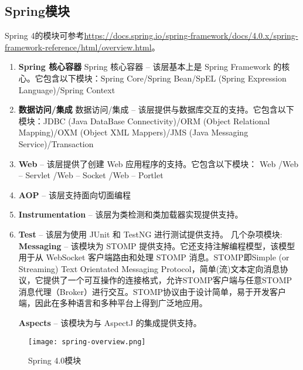 \documentclass[../../../interview-questions.tex]{subfiles}
\begin{document}
\subsection{Spring模块}

Spring 4的模块可参考\url{https://docs.spring.io/spring-framework/docs/4.0.x/spring-framework-reference/html/overview.html}。

\begin{enumerate}
    \item {\textbf{Spring 核心容器}}
Spring 核心容器 – 该层基本上是 Spring Framework 的核心。它包含以下模块：Spring Core/Spring Bean/SpEL (Spring Expression Language)/Spring Context
    \item{\textbf{数据访问/集成}}
数据访问/集成 – 该层提供与数据库交互的支持。它包含以下模块：JDBC (Java DataBase Connectivity)/ORM (Object Relational Mapping)/OXM (Object XML Mappers)/JMS (Java Messaging Service)/Transaction
\item{\textbf{Web} – 该层提供了创建 Web 应用程序的支持。}它包含以下模块：
Web
/Web – Servlet
/Web – Socket
/Web – Portlet
\item{\textbf{AOP} – 该层支持面向切面编程}
\item{\textbf{Instrumentation} – 该层为类检测和类加载器实现提供支持。}
\item{\textbf{Test} – 该层为使用 JUnit 和 TestNG 进行测试提供支持。}
几个杂项模块:
\textbf{Messaging} – 该模块为 STOMP 提供支持。它还支持注解编程模型，该模型用于从 WebSocket 客户端路由和处理 STOMP 消息。STOMP即Simple (or Streaming) Text Orientated Messaging Protocol，简单(流)文本定向消息协议，它提供了一个可互操作的连接格式，允许STOMP客户端与任意STOMP消息代理（Broker）进行交互。STOMP协议由于设计简单，易于开发客户端，因此在多种语言和多种平台上得到广泛地应用。

\textbf{Aspects} – 该模块为与 AspectJ 的集成提供支持。
\end{enumerate}

\begin{figure}[htbp]
	\centering
	\texttt{[image: spring-overview.png]}
	\caption{Spring 4.0模块}
	\label{fig:springoverview}
\end{figure}
\end{document}
